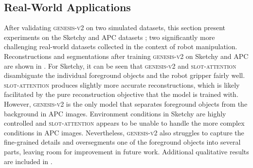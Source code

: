 \documentclass{article}
\begin{document}
\subsection{Real-World Applications}
\label{sec:experiments:realworld}

After validating \textsc{genesis-v2} on two simulated datasets, this section present experiments on the Sketchy \cite{cabi2019scaling} and APC datasets \cite{zeng2016multi}; two significantly more challenging real-world datasets collected in the context of robot manipulation.
Reconstructions and segmentations after training \textsc{genesis-v2} on Sketchy and APC are shown in .
For Sketchy, it can be seen that \textsc{genesis-v2} and \textsc{slot-attention} disambiguate the individual foreground objects and the robot gripper fairly well.
\textsc{slot-attention} produces slightly more accurate reconstructions, which is likely facilitated by the pure reconstruction objective that the model is trained with.
However, \textsc{genesis-v2} is the only model that separates foreground objects from the background in APC images.
Environment conditions in Sketchy are highly controlled and \textsc{slot-attention} appears to be unable to handle the more complex conditions in APC images.
Nevertheless, \textsc{genesis-v2} also struggles to capture the fine-grained details and oversegments one of the foreground objects into several parts, leaving room for improvement in future work.
Additional qualitative results are included in .
\end{document}
